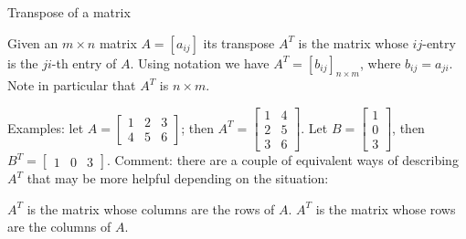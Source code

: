 \begin{frame}{Transpose of a matrix}
\begin{definition}
Given an $m\times n$ matrix $A=[a_{ij}]$ its transpose $A^T$ is the matrix whose $ij$-entry is the $ji$-th entry of $A$. 
\bspace Using notation we have $A^T=[b_{ij}]_{n\times m}$, where $b_{ij}=a_{ji}$. 
\bspace Note in particular that $A^T$ is $n\times m$.
\end{definition}
\pause
\alert{Examples:} let $A=\begin{bmatrix}
1&2&3\\4&5&6
\end{bmatrix}$; then $A^T=\begin{bmatrix}
1&4\\2&5\\3&6
\end{bmatrix}$. 
\bspace
Let $B=\begin{bmatrix}
1\\0\\3
\end{bmatrix}$, then $B^T=\begin{bmatrix}
1&0&3
\end{bmatrix}$.
\bpause
\alert{Comment:} there are a couple of equivalent ways of describing $A^T$ that may be more helpful depending on the situation:
\begin{itemize}
\ii $A^T$ is the matrix whose columns are the rows of $A$.
\ii $A^T$ is the matrix whose rows are the columns of $A$. 
\end{itemize} 

\end{frame}
